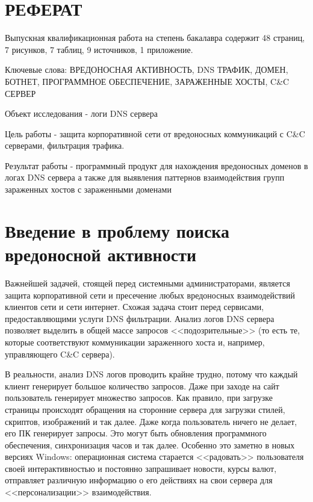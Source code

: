 \documentclass[a4paper,14pt]{extreport} %
\begin{document}
\newpage
\clearpage
{}
\chapter*{РЕФЕРАТ}
Выпускная квалификационная работа на степень бакалавра содержит 48 страниц, 7 рисунков, 7 таблиц, 9 источников, 1 приложение.
\newline

Ключевые слова: ВРЕДОНОСНАЯ АКТИВНОСТЬ, DNS ТРАФИК, ДОМЕН, БОТНЕТ, ПРОГРАММНОЕ ОБЕСПЕЧЕНИЕ, ЗАРАЖЕННЫЕ ХОСТЫ, C\&C СЕРВЕР
\newline

Объект исследования - логи DNS сервера

Цель работы - защита корпоративной сети от вредоносных коммуникаций с C\&C серверами, фильтрация трафика.

Результат работы - программный продукт для нахождения вредоносных доменов в логах DNS сервера а также для выявления паттернов взаимодействия групп зараженных хостов с зараженными доменами


\renewcommand\contentsname{Содержание}

\tableofcontents



\chapter{Введение в проблему поиска вредоносной активности}

Важнейшей задачей, стоящей перед системными администраторами, является защита корпоративной сети и пресечение любых вредоносных взаимодействий клиентов сети и сети интернет. Схожая задача стоит перед сервисами, предоставляющими услуги DNS фильтрации. Анализ логов DNS сервера позволяет выделить в общей массе запросов <<подозрительные>> (то есть те, которые соответствуют коммуникации зараженного хоста и, например, управляющего C\&C сервера). 

В реальности, анализ DNS логов проводить крайне трудно, потому что каждый клиент генерирует большое количество запросов. Даже при заходе на сайт пользователь генерирует множество запросов. Как правило, при загрузке страницы происходят обращения на сторонние сервера для загрузки стилей, скриптов, изображений и так далее. Даже когда пользователь ничего не делает, его ПК генерирует запросы. Это могут быть обновления программного обеспечения, синхронизация часов и так далее. Особенно это заметно в новых версиях Windows: операционная система старается <<радовать>> пользователя своей интерактивностью и постоянно запрашивает новости, курсы валют, отправляет различную информацию о его действиях на свои сервера для <<персонализации>> взаимодействия.
\end{document}
